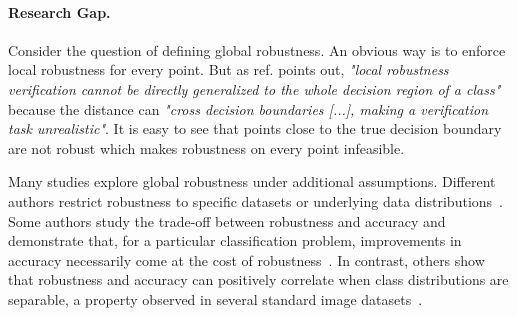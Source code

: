 \paragraph{Research Gap.} Consider the question of defining global robustness. An obvious way is to enforce local robustness for every point. But as ref. \cite{li2024certifying} points out, \textit{"local robustness verification cannot be directly generalized to the whole decision region of a class"} because the distance can \textit{"cross decision boundaries [...], making a verification task unrealistic"}. It is easy to see that points close to the true decision boundary are not robust which makes robustness on every point infeasible. 

Many studies explore global robustness under additional assumptions. Different authors restrict robustness to specific datasets or underlying data distributions~\cite{casadio2022neural,tsipras2018robustness,zhang2019theoretically,yang2020closer,mangal2023certifying}. Some authors study the trade-off between robustness and accuracy and demonstrate that, for a particular classification problem, improvements in accuracy necessarily come at the cost of robustness~\cite{tsipras2018robustness,zhang2019theoretically}.
In contrast, others show that robustness and accuracy can positively correlate when class distributions are separable, a property observed in several standard image datasets~\cite{yang2020closer,mangal2023certifying}. 

